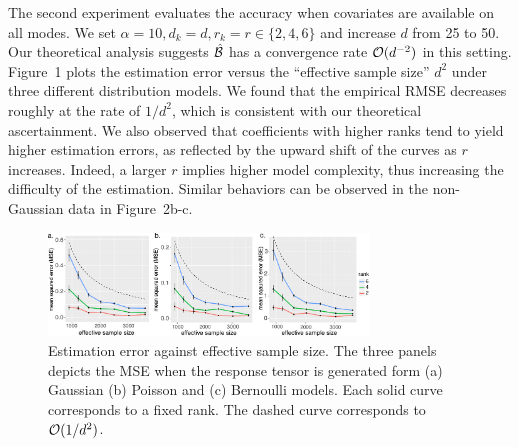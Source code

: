 \documentclass[twoside]{article}
\theoremstyle{plain}
\theoremstyle{definition}
\begin{document}
\begin{table}[t]
\caption{Performance for rank selection via BIC. Bold number indicates no significant difference between the estimate and the ground truth, based on a $z$-test with a level 0.05.}\label{tab:rank}
\end{table}

The second experiment evaluates the accuracy when covariates are available on all modes. We set $\alpha=10, d_k=d, r_k=r\in\{2,4,6\}$ and increase $d$ from 25 to 50. Our theoretical analysis suggests $\hat {\mathcal{B}}$ has a convergence rate $\mathcal{O}(d^{-2})$ in this setting. Figure~1 plots the estimation error versus the ``effective sample size'' $d^2$ under three different distribution models. We found that the empirical RMSE decreases roughly at the rate of $1/d^2$, which is consistent with our theoretical ascertainment. We also observed that coefficients with higher ranks tend to yield higher estimation errors, as reflected by the upward shift of the curves as $r$ increases. Indeed, a larger $r$ implies higher model complexity, thus increasing the difficulty of the estimation. Similar behaviors can be observed in the non-Gaussian data in Figure~2b-c. 

\begin{figure}[H]
\includegraphics[width=8.5cm]{..//../code/binary_tucker/team/figure/dimension.pdf}
\caption{Estimation error against effective sample size. The three panels depicts the MSE when the response tensor is generated form (a) Gaussian (b) Poisson and (c) Bernoulli models. Each solid curve corresponds to a fixed rank. The dashed curve corresponds to $\mathcal{O}({1/d^2})$.}
\end{figure}
\end{document}
